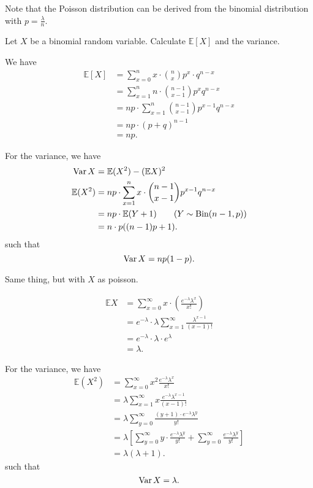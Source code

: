 
Note that the Poisson distribution can be derived from the binomial distribution with \( p = \frac{\lambda}{n} \).

\begin{eg}
	Let \( X  \) be a binomial random variable. Calculate \( \mathbb{E}[X] \) and the variance.
\end{eg}
\begin{explanation}
	We have
	\begin{align*}
		\mathbb{E}[X] &= \sum_{x=0}^{n} x \cdot  \binom{n}{x} p^{x}  \cdot q^{n-x}  \\
		&= \sum_{x=1}^{n} n \cdot \binom{n-1}{x-1} p^{x} q^{n-x}   \\
		&= np \cdot \sum_{x=1}^{n} \binom{n-1}{x-1} p^{x-1} q^{n-x}   \\
		&= np \cdot (p + q)^{n-1}  \\
			&= np
	.\end{align*}

	For the variance, we have
	\begin{align*}
		\Var X &= \mathbb{E}(X^{2}) - (\mathbb{E}X)^{2}  \\
		\mathbb{E}(X^{2} ) &= np \cdot \sum_{x=1}^{n} x\cdot \binom{n-1}{x-1} p^{x-1} q^{n-x}  \\
											 &= np \cdot \mathbb{E}(Y + 1) \tag{\( Y \sim \text{Bin}(n - 1, p) \)} \\
		&= n\cdot p((n-1)p+1)
	.\end{align*}
	such that \[
		\operatorname{Var} X = np(1-p)
	.\] 
\end{explanation}

\begin{eg}
	Same thing, but with \( X \) as poisson.
\end{eg}
\begin{explanation}
	\begin{align*}
		\mathbb{E}X &= \sum_{x=0}^{\infty} x\cdot \left( \frac{e^{-\lambda }\lambda ^{x}}{x!} \right) \\
		&= e^{-\lambda }\cdot \lambda  \sum_{x=1}^{\infty} \frac{\lambda ^{x-1} }{(x-1)!} \\
		&= e^{-\lambda }\cdot \lambda \cdot e^{\lambda } \tag{Change of vars.}   \\
		&= \lambda
	.\end{align*}

	For the variance, we have 
	\begin{align*}
		\mathbb{E}(X ^{2}) &= \sum_{x=0}^{\infty} x^{2} \frac{e^{-\lambda }\lambda ^{x}  }{x!}  \\
		&= \lambda \sum_{x=1}^{\infty} x \frac{e^{-\lambda }\lambda ^{x-1} }{(x-1)!} \\
		&= \lambda \sum_{y=0}^{\infty} \frac{(y+1)\cdot e^{-\lambda }\lambda ^{y}  }{y!} \\
		&= \lambda \left[ \sum_{y=0}^{\infty} y\cdot \frac{e^{-\lambda }\lambda ^{y}  }{y!} + \sum_{y=0}^{\infty} \frac{e^{-\lambda }\lambda ^{y}  }{y!} \right] \\
		&= \lambda (\lambda  + 1)
	.\end{align*}
	such that \[
		\operatorname{Var} X = \lambda 
	.\] 
\end{explanation}

